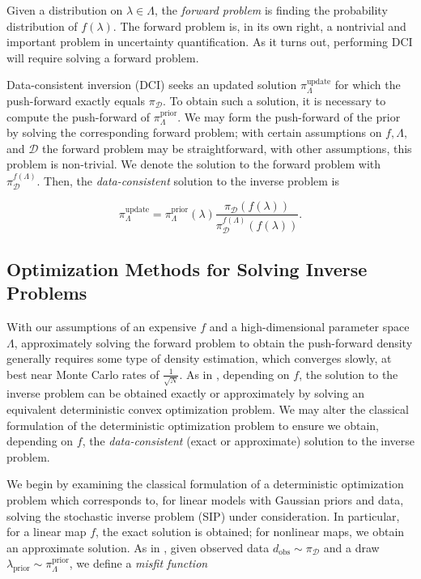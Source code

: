 \documentclass{amsart}
\begin{document}
Given a distribution on $\lambda \in \Lambda$, the \emph{forward problem} is finding the probability distribution of $f(\lambda)$. The forward problem is, in its own right, a nontrivial and important problem in uncertainty quantification. As it turns out, performing DCI will require solving a forward problem. 

Data-consistent inversion (DCI) seeks an updated solution $\pi_\Lambda^\text{update}$ for which the push-forward exactly equals $\pi_\mathcal{D}$. To obtain such a solution, it is necessary to compute the push-forward of $\pi_\Lambda^\text{prior}$. We may form the push-forward of the prior by solving the corresponding forward problem; with certain assumptions on $f, \Lambda,$ and $\mathcal{D}$ the forward problem may be straightforward, with other assumptions, this problem is non-trivial. We denote the solution to the forward problem with $\pi_\mathcal{D}^{f(\Lambda)}$. Then, the \textit{data-consistent} solution to the inverse problem is

\begin{equation} \label{eq:1}
\pi_\Lambda^\text{update}=\pi_\Lambda^\text{prior}(\lambda)\frac{\pi_\mathcal{D}(f(\lambda))}{\pi_\mathcal{D}^{f(\Lambda)}(f(\lambda))}.
\end{equation}

\subsection{Optimization Methods for Solving Inverse Problems}

With our assumptions of an expensive $f$ and a high-dimensional parameter space $\Lambda$, approximately solving the forward problem to obtain the push-forward density generally requires some type of  density estimation, which converges slowly, at best  near Monte Carlo rates of $ \frac{1}{\sqrt{N}}$. As in \cite{Tarantola}, depending on $f$, the solution to the inverse problem can be obtained exactly or approximately by solving an equivalent deterministic convex optimization problem. We may alter the  classical formulation of the deterministic optimization problem to ensure we obtain, depending on $f$, the \textit{data-consistent} (exact or approximate) solution to the inverse problem.

We begin by examining the classical 
formulation of a deterministic optimization problem which corresponds to, for linear models with Gaussian priors and data,  
solving the stochastic inverse problem (SIP) under consideration. In particular, for a linear map $f$, the exact solution is obtained; for nonlinear maps, we obtain an approximate solution. As in \cite{Tarantola}, given observed data $d_{\text{obs}} \sim \pi_\mathcal{D}$ and a draw $\lambda_\text{prior}\sim \pi_\Lambda^\text{prior}$, we define a \textit{misfit function}
\end{document}
